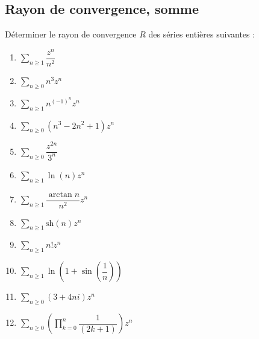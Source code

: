 \documentclass[a4paper,twoside,french,11pt]{VcCours}
\newcommand{\Sum}[2]{\sum_{#1}^{#2}}
\begin{document}

\tableofcontents
\separationTitre


\subsection{Rayon de convergence, somme}


\begin{Exercice}{} Déterminer le rayon de convergence $R$ des séries entières suivantes :

\begin{multicols}{3}
\begin{enumerate}
\item $\Sum{n \geq 1}{} \dfrac{z^n}{n^2}$
\item $\Sum{n \geq 0}{} n^3 z^n$
\item $\Sum{n \geq 1}{} n^{(-1)^n}z^n$
\item $\Sum{n \geq 0}{} (n^3-2n^2+1)z^n$
\columnbreak
\item $\Sum{n \geq 0}{} \dfrac{z^{2n}}{3^n}$
\item $\Sum{n \geq 1}{} \ln(n) z^n$
\item $\Sum{n \geq 1}{} \dfrac{\arctan n}{n^2}z^n$
\item $\Sum{n \geq 1}{} \textrm{sh}(n) z^n$
\columnbreak
\item $\Sum{n \geq 1}{} n! z^n$
\item $\Sum{n \geq 1}{}\ln\left(1+\sin \left(\dfrac{1}{n}\right) \right)$
\item $\Sum{n \geq 0}{} (3+4ni) z^n$
\item $\Sum{n \geq 0}{}   \left(\prod_{k=0}^n\dfrac{1}{(2k+1)}\right) z^n$
\end{enumerate}
\end{multicols}


\end{Exercice}
\end{document}
